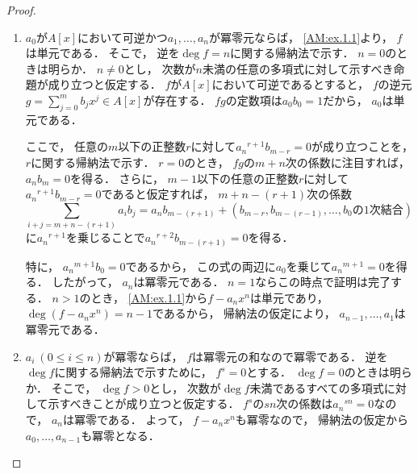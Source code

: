 \documentclass{jlreq}
\begin{document}
	\begin{proof}
		\quad
		\begin{enumerate}
			\item $a_0$が$A[x]$において可逆かつ$a_1, \dotsc, a_n$が冪零元ならば，
			\cref{AM:ex.1.1}より，
			$f$は単元である．
			そこで，
			逆を$\deg f = n$に関する帰納法で示す．
			$n = 0$のときは明らか．
			$n \ne 0$とし，
			次数が$n$未満の任意の多項式に対して示すべき命題が成り立つと仮定する．
			$f$が$A[x]$において可逆であるとすると，
			$f$の逆元$g = \sum_{j=0}^{m} b_j x^j \in A[x]$が存在する．
			$fg$の定数項は$a_0 b_0 = 1$だから，
			$a_0$は単元である．
			
			ここで，
			任意の$m$以下の正整数$r$に対して${a_n}^{r+1} b_{m-r} = 0$が成り立つことを，
			$r$に関する帰納法で示す．
			$r=0$のとき，
			$fg$の$m+n$次の係数に注目すれば，
			$a_n b_m = 0$を得る．
			さらに，
			$m-1$以下の任意の正整数$r$に対して${a_n}^{r+1} b_{m-r} = 0$であると仮定すれば，
			$m+n-(r+1)$次の係数
			\begin{equation}
				\sum_{i+j=m+n-(r+1)} a_i b_j
				= a_n b_{m-(r+1)} + (\text{$b_{m-r}, b_{m-(r-1)}, \ldots, b_0$の1次結合})
			\end{equation}
			に${a_n}^{r+1}$を乗じることで${a_n}^{r+2} b_{m-(r+1)} = 0$を得る．
			
			特に，
			${a_n}^{m+1} b_0 = 0$であるから，
			この式の両辺に$a_0$を乗じて${a_n}^{m+1} = 0$を得る．
			したがって，
			$a_n$は冪零元である．
			$n=1$ならこの時点で証明は完了する．
			$n>1$のとき，
			\cref{AM:ex.1.1}から$f - a_n x^n$は単元であり，
			$\deg(f - a_n x^n) = n-1$であるから，
			帰納法の仮定により，
			$a_{n-1}, \dotsc, a_1$は冪零元である．
			\item $a_i\ (0 \le i \le n)$が冪零ならば，
			$f$は冪零元の和なので冪零である．
			逆を$\deg f$に関する帰納法で示すために，
			$f^s = 0$とする．
			$\deg f = 0$のときは明らか．
			そこで，
			$\deg f > 0$とし，
			次数が$\deg f$未満であるすべての多項式に対して示すべきことが成り立つと仮定する．
			$f^s$の$sn$次の係数は${a_n}^{sn} = 0$なので，
			$a_n$は冪零である．
			よって，
			$f - a_n x^n$も冪零なので，
			帰納法の仮定から$a_0, \dotsc, a_{n-1}$も冪零となる．\qedhere
		\end{enumerate}
	\end{proof}
	
\end{document}
